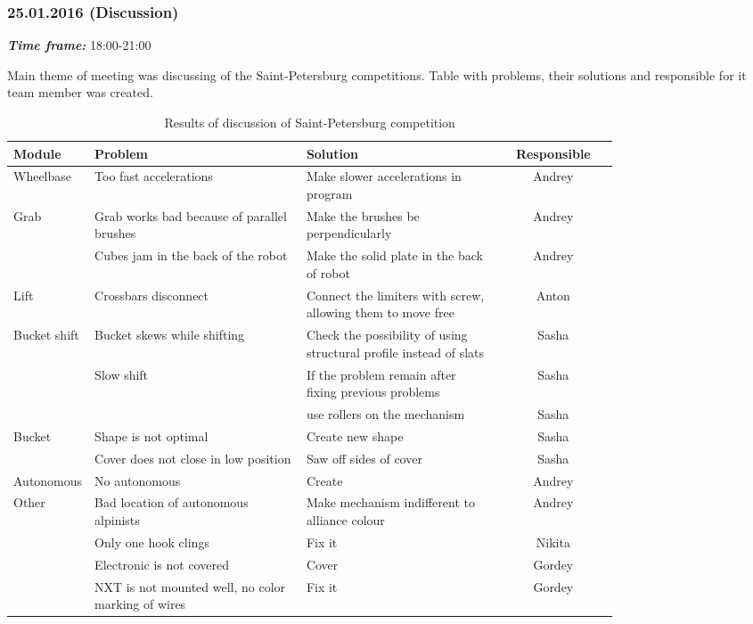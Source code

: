 \subsubsection{25.01.2016 (Discussion)}
\textit{\textbf{Time frame:}} 18:00-21:00 \newline

Main theme of meeting was discussing of the Saint-Petersburg competitions. Table with problems, their solutions and responsible for it team member was created.

\begin{table}[h!]
  \caption{Results of discussion of Saint-Petersburg competition}
  \centering
    \begin{tabular}{|p{0.12\linewidth}|p{0.35\linewidth}|p{0.32\linewidth}|c|}
    	\hline
		Module & Problem & Solution & Responsible \\
		\hline
		Wheelbase & Too fast accelerations & Make slower accelerations in program & \multicolumn{1}{c|}{Andrey} \\
		\hline
		Grab  & Grab works bad because of parallel brushes & Make the brushes be perpendicularly & \multicolumn{1}{c|}{Andrey} \\
		& Cubes jam in the back of the robot & Make the solid plate in the back of robot & \multicolumn{1}{c|}{Andrey} \\
		\hline
		Lift  & Crossbars disconnect & Connect the limiters with screw, allowing them to move free & \multicolumn{1}{c|}{Anton} \\
		\hline
		Bucket shift & Bucket skews while shifting & Check the possibility of using structural profile instead of slats & \multicolumn{1}{c|}{Sasha} \\
		& Slow shift & If the problem remain after fixing previous problems & \multicolumn{1}{c|}{Sasha} \\
		&       & use rollers on the mechanism & \multicolumn{1}{c|}{Sasha} \\
		\hline
		Bucket & Shape is not optimal & Create new shape & \multicolumn{1}{c|}{Sasha} \\
		& Cover does not close in low position & Saw off sides of cover & \multicolumn{1}{c|}{Sasha} \\
		\hline
		Autonomous & No autonomous & Create & \multicolumn{1}{c|}{Andrey} \\
		\hline
		Other & Bad location of autonomous alpinists & Make mechanism indifferent to alliance colour & \multicolumn{1}{c|}{Andrey} \\
		& Only one hook clings & Fix it & \multicolumn{1}{c|}{Nikita} \\
		& Electronic is not covered & Cover & \multicolumn{1}{c|}{Gordey} \\
		& NXT is not mounted well, no color marking of wires & Fix it & \multicolumn{1}{c|}{Gordey} \\
		\hline
    \end{tabular}%
  \label{tabular:meetingSPB25.01}%
\end{table}%